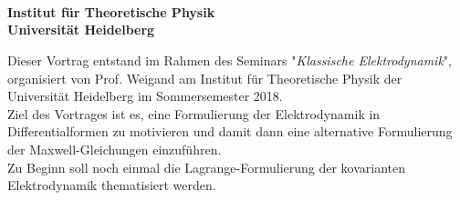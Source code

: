 \begin{center}

	\makeatletter
	\thispagestyle{plain}
	\LARGE\textbf{\@title} \\
	\vspace{2mm}
	\large\bfseries{\@author} \\
	\normalfont
	\vspace{2mm}
	\large{\@date} \\
	\vspace{2mm}
	\large{Institut für Theoretische Physik \\
		Universität Heidelberg} \\
	\makeatother
\end{center}

\normalsize

Dieser Vortrag entstand im Rahmen des Seminars "\textit{Klassische Elektrodynamik}", organisiert von Prof. Weigand am Institut für Theoretische Physik der Universität Heidelberg im Sommersemester 2018. \\
Ziel des Vortrages ist es, eine Formulierung der Elektrodynamik in Differentialformen zu motivieren und damit dann eine alternative Formulierung der Maxwell-Gleichungen einzuführen.  \\
 Zu Beginn soll noch einmal die Lagrange-Formulierung der kovarianten Elektrodynamik thematisiert werden. 

